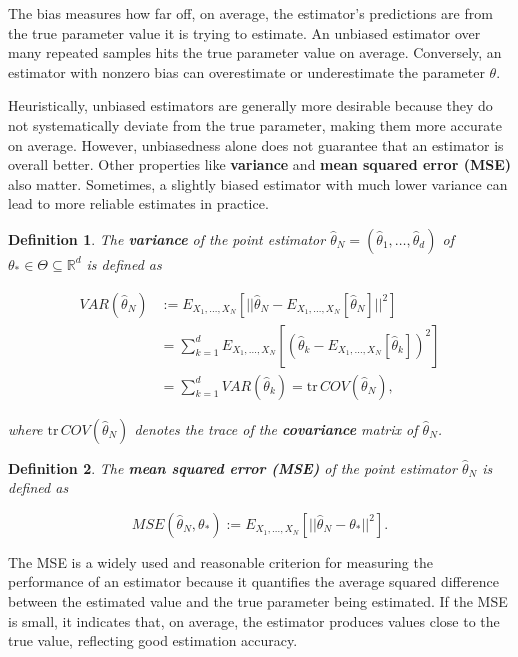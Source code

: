 \documentclass{report}
\newtheorem{definition}{Definition}[chapter]
\begin{document}
The bias measures how far off, on average, the estimator's predictions are from the true parameter value it is trying to estimate. An unbiased estimator over many repeated samples hits the true parameter value on average. Conversely, an estimator with nonzero bias can overestimate or underestimate the parameter $\theta$.

Heuristically, unbiased estimators are generally more desirable because they do not systematically deviate from the true parameter, making them more accurate on average. However, unbiasedness alone does not guarantee that an estimator is overall better. Other properties like \textbf{variance} and \textbf{mean squared error (MSE)} also matter. Sometimes, a slightly biased estimator with much lower variance can lead to more reliable estimates in practice.

\begin{definition}
The \textbf{variance} of the point estimator $\hat{\theta}_N = (\hat{\theta}_{1},\dots,\hat{\theta}_{d})$ of $\theta_* \in \Theta \subseteq \mathbb{R}^d$ is defined as

\begin{equation}
\begin{split}
VAR(\hat{\theta}_N) & := E_{X_1,\dots,X_N}[||\hat{\theta}_N-E_{X_1,\dots,X_N}[\hat{\theta}_N]||^2] \\
& = \sum_{k=1}^{d}E_{X_1,\dots,X_N}[(\hat{\theta}_{k}-E_{X_1,\dots,X_N}[\hat{\theta}_{k}])^2] \\
& = \sum_{k=1}^{d}VAR(\hat{\theta}_{k}) = \mathrm{tr}\,COV(\hat{\theta}_N),
\end{split}
\end{equation}

where $\mathrm{tr}\,COV(\hat{\theta}_N)$ denotes the trace of the \textbf{covariance} matrix of $\hat{\theta}_N$.
\end{definition}

\begin{definition}
The \textbf{mean squared error (MSE)} of the point estimator $\hat{\theta}_N$ is defined as

\begin{equation}
MSE(\hat{\theta}_N,\theta_*) := E_{X_1,\dots,X_N}[||\hat{\theta}_N - \theta_*||^2].
\end{equation}
\end{definition}

The MSE is a widely used and reasonable criterion for measuring the performance of an estimator because it quantifies the average squared difference between the estimated value and the true parameter being estimated. If the MSE is small, it indicates that, on average, the estimator produces values close to the true value, reflecting good estimation accuracy.
\end{document}
